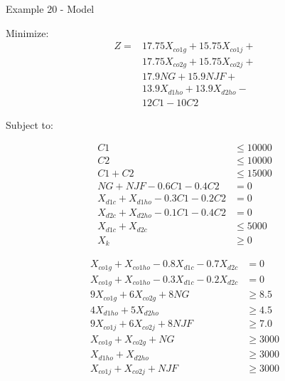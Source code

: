 \begin{frame}{Example 20 - Model}

Minimize:
\begin{align*}
    Z =& 17.75X_{co1g} + 15.75X_{co1j} + \\
       & 17.75X_{co2g} + 15.75X_{co2j} + \\
       & 17.9NG + 15.9NJF + \\
       & 13.9X_{d1ho} + 13.9X_{d2ho} - \\
       & 12C1 - 10C2
\end{align*}

Subject to:
\vspace{-1cm}
\begin{multicols}{2}
\tiny{
\begin{align*}
    C1 &\le 10000 \\
    C2 &\le 10000 \\
    C1 + C2 &\le 15000 \\
    NG + NJF - 0.6C1 - 0.4C2 &= 0 \\
    X_{d1c} + X_{d1ho} - 0.3C1 - 0.2C2 &= 0 \\
    X_{d2c} + X_{d2ho} - 0.1C1 - 0.4C2 &= 0 \\
    X_{d1c} + X_{d2c} &\le 5000 \\
    X_{k} &\ge 0
\end{align*}
}

\vfill
\columnbreak

\tiny{
\begin{align*}
    X_{co1g} + X_{co1ho} - 0.8X_{d1c} - 0.7X_{d2c} &= 0 \\
    X_{co1g} + X_{co1ho} - 0.3X_{d1c} - 0.2X_{d2c} &= 0 \\
    9X_{co1g} + 6X_{co2g} + 8NG &\ge 8.5 \\
    4X_{d1ho} + 5X_{d2ho} &\ge 4.5 \\
    9X_{co1j} + 6X_{co2j} + 8NJF &\ge 7.0 \\
    X_{co1g} + X_{co2g} + NG &\ge 3000 \\
    X_{d1ho} + X_{d2ho} &\ge 3000 \\
    X_{co1j} + X_{co2j} + NJF &\ge 3000 \\
\end{align*}
}
\end{multicols}

\end{frame}
